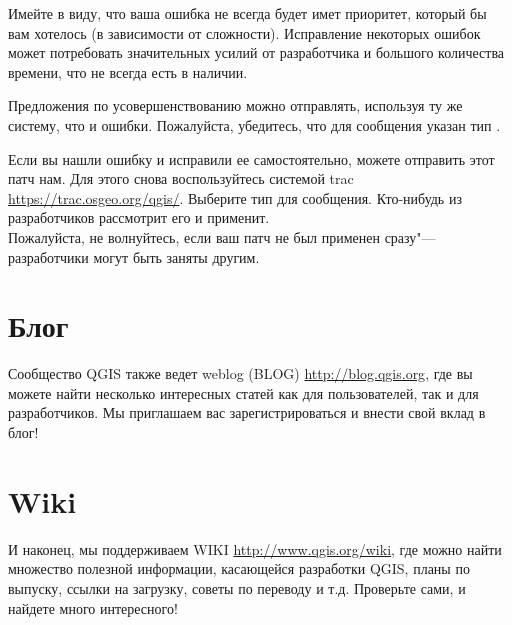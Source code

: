 Имейте в виду, что ваша ошибка не всегда будет имет приоритет, который
бы вам хотелось (в зависимости от сложности). Исправление некоторых
ошибок может потребовать значительных усилий от разработчика и большого
количества времени, что не всегда есть в наличии.

Предложения по усовершенствованию можно отправлять, используя ту же
систему, что и ошибки. Пожалуйста, убедитесь, что для сообщения указан
тип .

Если вы нашли ошибку и исправили ее самостоятельно, можете отправить
этот патч нам. Для этого снова воспользуйтесь системой trac
\url{https://trac.osgeo.org/qgis/}. Выберите тип  для
сообщения. Кто-нибудь из разработчиков рассмотрит его и применит. \\
Пожалуйста, не волнуйтесь, если ваш патч не был применен сразу"---
разработчики могут быть заняты другим.


\section{Блог}
Сообщество QGIS также ведет weblog (BLOG) \url{http://blog.qgis.org},
где вы можете найти несколько интересных статей как для пользователей,
так и для разработчиков. Мы приглашаем вас зарегистрироваться и внести
свой вклад в блог!

\section{Wiki}
И наконец, мы поддерживаем WIKI \url{http://www.qgis.org/wiki}, где
можно найти множество полезной информации, касающейся разработки QGIS,
планы по выпуску, ссылки на загрузку, советы по переводу и т.д.
Проверьте сами, и найдете много интересного!
